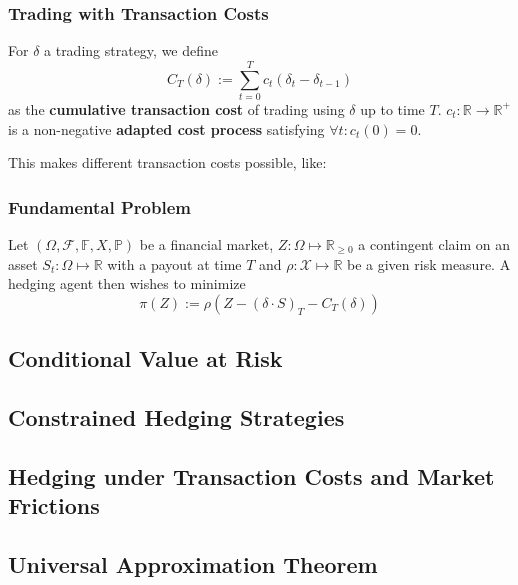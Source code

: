 \documentclass[serif]{beamer}
\def\R{{\mathbb R}}
\def\P{{\mathbb P}}
\def\O{{\Omega}}
\def\cF{{\mathcal F}}
\def\cX{{\mathcal X}}
\def\F{{\mathbb F}}
\def\vs{{\vspace{0.5cm}}}
\def\fm{{(\O, \cF, \F, X, \P)}}
\begin{document}
\begin{frame}[t]
    \frametitle{Trading with Transaction Costs}
    For $\delta$ a trading strategy, we define
    $$C_T (\delta) := \sum_{t=0}^T c_t (\delta_t - \delta_{t-1})$$
    as the \textbf{cumulative transaction cost} of
    trading using $\delta$ up to time $T$.
    $c_t : \R \to \R^+$ is a non-negative \textbf{adapted cost process}
    satisfying $\forall t: c_t (0) = 0$.
    \vs

    This makes different transaction costs possible, like:
    \begin{itemize}
    \end{itemize}
\end{frame}

\begin{frame}
    \frametitle{Fundamental Problem}
    Let $\fm$ be a financial market, $Z: \O \mapsto \R_{\geq 0}$ a contingent claim on an asset
    $S_t: \O \mapsto \R$ with a payout at time $T$ and
    $\rho: \cX \mapsto \R$ be a given risk measure.
    A hedging agent then wishes to minimize
    \[
        \pi (Z) := \rho (
        Z - (\delta \cdot S)_T - C_T (\delta)
        )
    \]
\end{frame}

\subsection{Conditional Value at Risk}

\subsection{Constrained Hedging Strategies}
\subsection{Hedging under Transaction Costs and Market Frictions}
\subsection{Universal Approximation Theorem}
\end{document}
